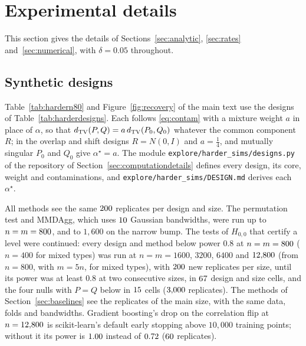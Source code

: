 \section{Experimental details}
\label{app:experiments}

This section gives the details of Sections~\ref{sec:analytic}, \ref{sec:rates} and~\ref{sec:numerical}, with
$\delta=0.05$ throughout.

\subsection{Synthetic designs}

Table~\ref{tab:hardern80} and Figure~\ref{fig:recovery} of the main text use the designs of
Table~\ref{tab:harderdesigns}. Each follows \eqref{eq:contam} with a mixture weight $a$ in place of $\alpha$, so that
$d_{\mathrm{TV}}(P,Q)=a\,d_{\mathrm{TV}}(P_0,Q_0)$ whatever the common component $R$; in the overlap and shift designs $R=N(0,I)$ and
$a=\tfrac14$, and mutually singular $P_0$ and $Q_0$ give $\alpha^\star=a$. The module
\texttt{explore/harder\_sims/designs.py} of the repository of Section~\ref{sec:computationdetails} defines every design,
its core, weight and contaminations, and \texttt{explore/harder\_sims/DESIGN.md} derives each $\alpha^\star$.

\begin{table}[t]
\centering
\scriptsize
\setlength{\tabcolsep}{4pt}

\caption{The synthetic designs of Section~\ref{sec:numharder}: $P_0$ against $Q_0$ ($P$ against $Q$ for the oscillating
designs); sizes $n=m$ at which every method that certifies a level was run, doubling ($m=5n$ for mixed types);
$\alpha^\star$, exact (small contamination: $0.05\,(2\Phi(5)-1)$); population MMD at the analytic test's bandwidth, by
Monte Carlo ($\approx0$: estimate of $\MMD^2$ not positive).}
\label{tab:harderdesigns}
\end{table}

All methods see the same $200$ replicates per design and size. The permutation test and MMDAgg, which uses
$10$ Gaussian bandwidths, were run up to $n=m=800$, and to $1{,}600$ on the narrow bump. The tests of
$H_{0,0}$ that certify a level were continued: every design and method below power $0.8$ at $n=m=800$ ($n=400$
for mixed types) was run at $n=m=1600$, $3200$, $6400$ and $12{,}800$ (from $n=800$, with $m=5n$, for mixed types),
with $200$ new replicates per size, until its power was at least $0.8$ at two consecutive sizes, in
$67$ design and size cells, and the four nulls with $P=Q$ below in $15$ cells
($3{,}000$ replicates). The methods of Section~\ref{sec:baselines} see the replicates of the main size,
with the same data, folds and bandwidths. Gradient boosting's drop on the correlation flip at $n=12{,}800$ is
scikit-learn's default early stopping above $10{,}000$ training points; without it its power is $1.00$
instead of $0.72$ ($60$ replicates).

